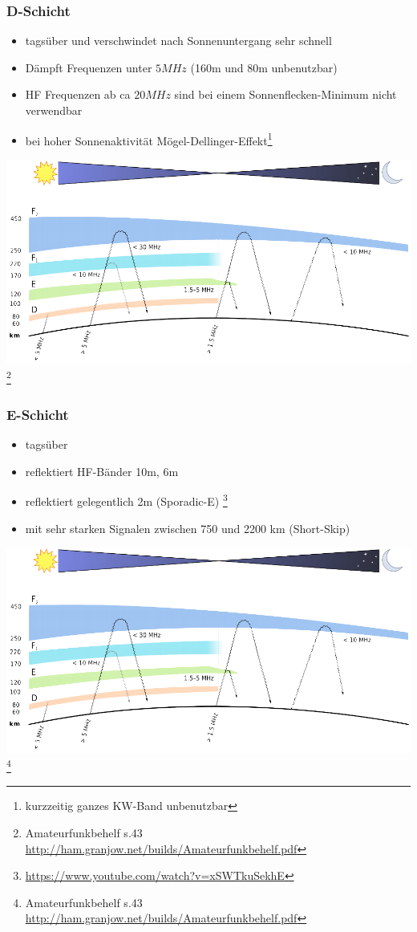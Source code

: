 \begin{frame}
    \frametitle{D-Schicht}
    \begin{itemize}
    			\item tagsüber und verschwindet nach Sonnenuntergang sehr schnell
				\item Dämpft Frequenzen unter $5MHz$ (160m und 80m unbenutzbar)
       		 	\item HF Frequenzen ab ca $20MHz$ sind bei einem Sonnenflecken-Minimum nicht verwendbar
       		 	\item bei hoher Sonnenaktivität
                      Mögel-Dellinger-Effekt\footnote{kurzzeitig ganzes KW-Band unbenutzbar}
    \end{itemize}
    \begin{center}
        \includegraphics[width=.6\textwidth,height=.5\textheight,keepaspectratio]{a08/schichten_behelf_43.png}
        \footnote{\tiny Amateurfunkbehelf s.43 \url{http://ham.granjow.net/builds/Amateurfunkbehelf.pdf}}
    \end{center}
\end{frame}

\begin{frame}
    \frametitle{E-Schicht}
    \begin{itemize}
    			\item tagsüber
				\item reflektiert HF-Bänder 10m, 6m
       		 	\item reflektiert gelegentlich 2m (Sporadic-E) \footnote{\tiny \url{https://www.youtube.com/watch?v=xSWTkuSekhE}}
       		 	\item mit sehr starken Signalen zwischen 750 und 2200 km (Short-Skip)
    \end{itemize}
    \begin{center}
        \includegraphics[width=.75\textwidth,height=.5\textheight,keepaspectratio]{a08/schichten_behelf_43.png}
        \footnote{\tiny Amateurfunkbehelf s.43 \url{http://ham.granjow.net/builds/Amateurfunkbehelf.pdf}}
    \end{center}
\end{frame}

